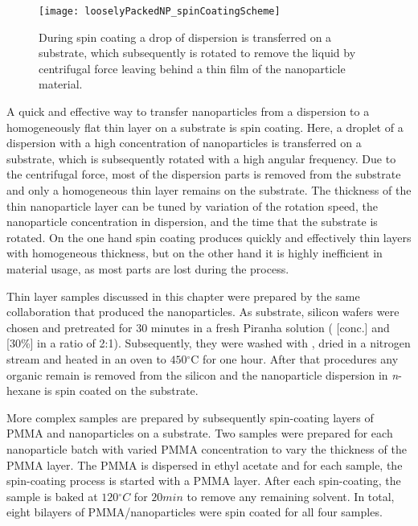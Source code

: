\documentclass[\main/dresen_thesis.tex]{subfiles}
\begin{document}
  \begin{figure}[tb]
    \centering
    \texttt{[image: looselyPackedNP\_spinCoatingScheme]}
    \caption{\label{fig:looselyPackedNP:preparation:spinCoatingScheme}During spin coating a drop of dispersion is transferred on a substrate, which subsequently is rotated to remove the liquid by centrifugal force leaving behind a thin film of the nanoparticle material.}
  \end{figure}

  A quick and effective way to transfer nanoparticles from a dispersion to a homogeneously flat thin layer on a substrate is spin coating.
  Here, a droplet of a dispersion with a high concentration of nanoparticles is transferred on a substrate, which is subsequently rotated with a high angular frequency.
  Due to the centrifugal force, most of the dispersion parts is removed from the substrate and only a homogeneous thin layer remains on the substrate.
  The thickness of the thin nanoparticle layer can be tuned by variation of the rotation speed, the nanoparticle concentration in dispersion, and the time that the substrate is rotated.
  On the one hand spin coating produces quickly and effectively thin layers with homogeneous thickness, but on the other hand it is highly inefficient in material usage, as most parts are lost during the process.

  Thin layer samples discussed in this chapter were prepared by the same collaboration that produced the nanoparticles.
  As substrate, silicon wafers were chosen and pretreated for 30 minutes in a fresh Piranha solution ( [conc.] and  [30\%] in a ratio of 2:1). Subsequently, they were washed with , dried in a nitrogen stream and heated in an oven to $450 \unit{^\circ \mathrm{C}}$ for one hour.
  After that procedures any organic remain is removed from the silicon and the nanoparticle dispersion in \textit{n}-hexane is spin coated on the substrate.

  More complex samples are prepared by subsequently spin-coating layers of PMMA and nanoparticles on a substrate.
  Two samples were prepared for each nanoparticle batch with varied PMMA concentration to vary the thickness of the PMMA layer.
  The PMMA is dispersed in ethyl acetate and for each sample, the spin-coating process is started with a PMMA layer.
  After each spin-coating, the sample is baked at $120 \unit{^\circ C}$ for $20 \unit{min}$ to remove any remaining solvent.
  In total, eight bilayers of PMMA/nanoparticles were spin coated for all four samples.
\end{document}
